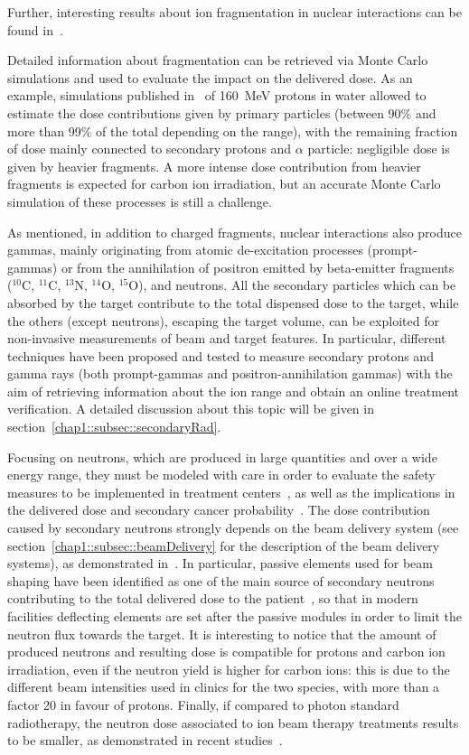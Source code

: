 Further, interesting results about ion fragmentation in nuclear interactions can be found in~\cite{Matsufuji2003, Wroe2005, Haettner2006, Gunzert-Marx2008, Haettner2013}.

Detailed information about fragmentation can be retrieved via Monte Carlo simulations and used to evaluate the impact on the delivered dose. As an example, simulations published in~\parencite{Grassberger2011} of 160~MeV protons in water allowed to estimate the dose contributions given by primary particles (between 90\% and more than 99\% of the total depending on the range), with the remaining fraction of dose mainly connected to secondary protons and $\alpha$ particle: negligible dose is given by heavier fragments. A more intense dose contribution from heavier fragments is expected for carbon ion irradiation, but an accurate Monte Carlo simulation of these processes is still a challenge.

As mentioned, in addition to charged fragments, nuclear interactions also produce gammas, mainly originating from atomic de-excitation processes (prompt-gammas) or from the annihilation of positron emitted by beta-emitter fragments ($^{10}$C, $^{11}$C, $^{13}$N, $^{14}$O, $^{15}$O), and neutrons. All the secondary particles which can be absorbed by the target contribute to the total dispensed dose to the target, while the others (except neutrons), escaping the target volume, can be exploited for non-invasive measurements of beam and target features. In particular, different techniques have been proposed and tested to measure secondary protons and gamma rays (both prompt-gammas and positron-annihilation gammas) with the aim of retrieving information about the ion range and obtain an online treatment verification. A detailed  discussion about this topic will be given in section~\ref{chap1::subsec::secondaryRad}.

Focusing on neutrons, which are produced in large quantities and over a wide energy range, they must be modeled with care in order to evaluate the safety measures to be implemented in treatment centers~\parencite{Newhauser2002}, as well as the implications in the delivered dose and secondary cancer probability~\parencite{Newhauser2011}. The dose contribution caused by secondary neutrons strongly depends on the beam delivery system (see section~\ref{chap1::subsec::beamDelivery} for the description of the beam delivery systems), as demonstrated in~\cite{Gottschalk2006}. In particular, passive elements used for beam shaping have been identified as one of the main source of secondary neutrons contributing to the total delivered dose to the patient~\parencite{Yan2002}, so that in modern facilities deflecting elements are set after the passive modules in order to limit the neutron flux towards the target. It is interesting to notice that the amount of produced neutrons and resulting dose is compatible for protons and carbon ion irradiation, even if the neutron yield is higher for carbon ions: this is due to the different beam intensities used in clinics for the two species, with more than a factor 20 in favour of protons. Finally, if compared to photon standard radiotherapy, the neutron dose associated to ion beam therapy treatments results to be smaller, as demonstrated in recent studies~\parencite{Schneider2015}.


